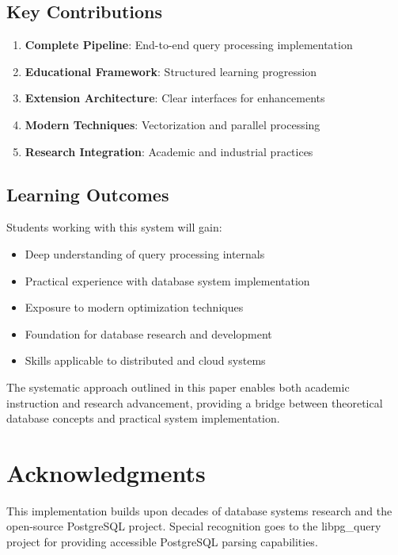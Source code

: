 \documentclass[12pt,a4paper]{article}
\begin{document}
    \subsection{Key Contributions}

    \begin{enumerate}
        \item \textbf{Complete Pipeline}: End-to-end query processing implementation
        \item \textbf{Educational Framework}: Structured learning progression
        \item \textbf{Extension Architecture}: Clear interfaces for enhancements
        \item \textbf{Modern Techniques}: Vectorization and parallel processing
        \item \textbf{Research Integration}: Academic and industrial practices
    \end{enumerate}

    \subsection{Learning Outcomes}

    Students working with this system will gain:

    \begin{itemize}
        \item Deep understanding of query processing internals
        \item Practical experience with database system implementation
        \item Exposure to modern optimization techniques
        \item Foundation for database research and development
        \item Skills applicable to distributed and cloud systems
    \end{itemize}

    The systematic approach outlined in this paper enables both academic instruction and research advancement, providing a bridge between theoretical database concepts and practical system implementation.

    \section{Acknowledgments}

    This implementation builds upon decades of database systems research and the open-source PostgreSQL project. Special recognition goes to the libpg\_query project for providing accessible PostgreSQL parsing capabilities.
\end{document}
